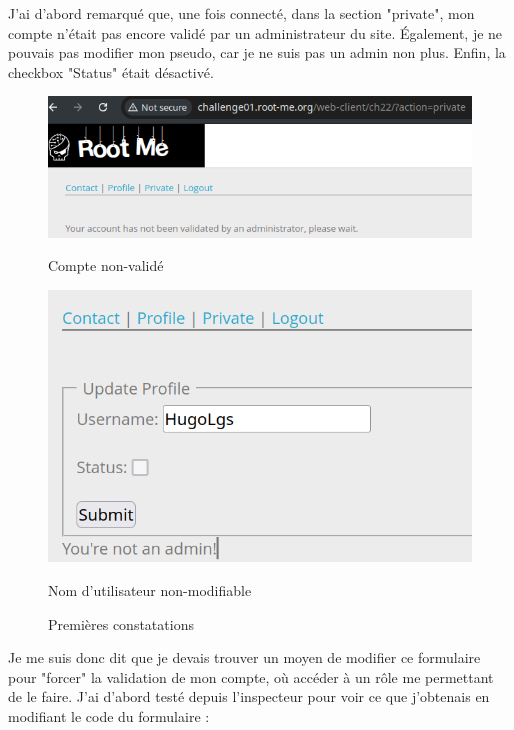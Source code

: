 \documentclass[12pt,a4paper]{article}
\begin{document}
	J'ai d'abord remarqué que, une fois connecté, dans la section "private", mon compte n'était pas encore validé par un administrateur du site. Également, je ne pouvais pas modifier mon pseudo, car je ne suis pas un admin non plus. Enfin, la checkbox "Status" était désactivé. \\
	
\begin{figure}[!h]
    \centering
    \begin{minipage}{0.45\textwidth}
        \centering
        \includegraphics[scale=0.7]{private_before.png}
        \caption{Compte non-validé}
    \end{minipage}
    \begin{minipage}{0.45\textwidth}
        \centering
        \includegraphics[scale=0.5]{not_admin.png}
        \caption{Nom d'utilisateur non-modifiable}
    \end{minipage}
    \caption{Premières constatations}
\end{figure}

Je me suis donc dit que je devais trouver un moyen de modifier ce formulaire pour "forcer" la validation de mon compte, où accéder à un rôle me permettant de le faire. J'ai d'abord testé depuis l'inspecteur pour voir ce que j'obtenais en modifiant le code du formulaire : 
\end{document}
